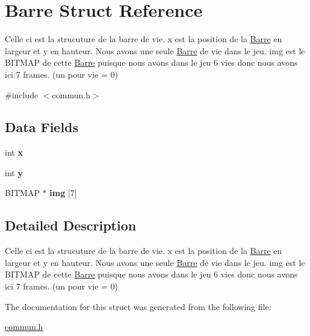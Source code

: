 \hypertarget{struct_barre}{\section{Barre Struct Reference}
\label{struct_barre}
}


Celle ci est la strucuture de la barre de vie. x est la position de la \hyperlink{struct_barre}{Barre} en largeur et y en hauteur. Nous avons une seule \hyperlink{struct_barre}{Barre} de vie dans le jeu. img est le B\-I\-T\-M\-A\-P de cette \hyperlink{struct_barre}{Barre} puisque nous avons dans le jeu 6 vies donc nous avons ici 7 frames. (un pour vie = 0)  




{\ttfamily \#include $<$commun.\-h$>$}

\subsection*{Data Fields}
\begin{DoxyCompactItemize}
\item 
\hypertarget{struct_barre_a6150e0515f7202e2fb518f7206ed97dc}{int {\bfseries x}}\label{struct_barre_a6150e0515f7202e2fb518f7206ed97dc}

\item 
\hypertarget{struct_barre_a0a2f84ed7838f07779ae24c5a9086d33}{int {\bfseries y}}\label{struct_barre_a0a2f84ed7838f07779ae24c5a9086d33}

\item 
\hypertarget{struct_barre_ab6b4c00f9aaa715f23d59ed627e5a92d}{B\-I\-T\-M\-A\-P $\ast$ {\bfseries img} \mbox{[}7\mbox{]}}\label{struct_barre_ab6b4c00f9aaa715f23d59ed627e5a92d}

\end{DoxyCompactItemize}


\subsection{Detailed Description}
Celle ci est la strucuture de la barre de vie. x est la position de la \hyperlink{struct_barre}{Barre} en largeur et y en hauteur. Nous avons une seule \hyperlink{struct_barre}{Barre} de vie dans le jeu. img est le B\-I\-T\-M\-A\-P de cette \hyperlink{struct_barre}{Barre} puisque nous avons dans le jeu 6 vies donc nous avons ici 7 frames. (un pour vie = 0) 


\begin{DoxyItemize}
\item 
\end{DoxyItemize}

The documentation for this struct was generated from the following file\-:\begin{DoxyCompactItemize}
\item 
\hyperlink{commun_8h}{commun.\-h}\end{DoxyCompactItemize}
